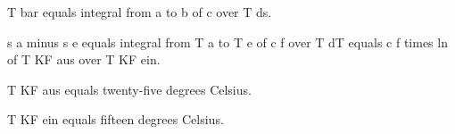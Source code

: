 T bar equals integral from a to b of c over T ds.

s a minus s e equals integral from T a to T e of c f over T dT equals c f times ln of T KF aus over T KF ein.

T KF aus equals twenty-five degrees Celsius.

T KF ein equals fifteen degrees Celsius.